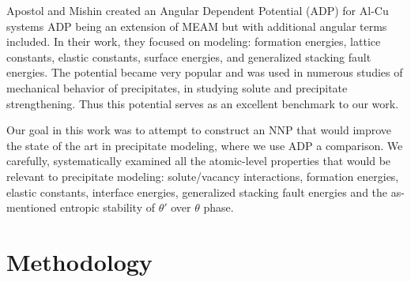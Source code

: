 \documentclass{article}
\begin{document}
Apostol and Mishin created an Angular Dependent Potential (ADP) for Al-Cu systems\cite{Apostol2011} ADP being an extension of MEAM but with additional angular terms included.
In their work, they focused on modeling: formation energies, lattice constants, elastic constants, surface energies, and generalized stacking fault energies.
The potential became very popular and was used in numerous studies of mechanical behavior of precipitates,
in studying solute and precipitate strengthening\cite{Singh2013AnAlloy}\cite{Esteban-Manzanares2019}\cite{Wu2020AtomisticAlloys}. Thus this potential serves as an excellent benchmark to our work. 

Our goal in this work was to attempt to construct an NNP that would improve the state of the art in precipitate modeling, where we use ADP a comparison.
We carefully, systematically examined all the atomic-level properties that would be relevant to precipitate modeling: solute/vacancy interactions, formation energies, elastic constants, interface energies, generalized stacking fault energies and the as-mentioned entropic stability of $\theta'$ over $\theta$ phase.


\section{Methodology}
\end{document}
